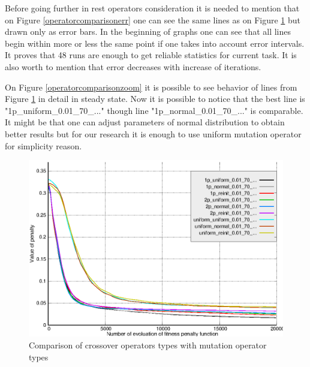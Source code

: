 \documentclass[12pt]{report}
\begin{document}
Before going further in rest operators consideration it is needed to mention that on Figure \ref{operatorcomparisonerr} one can see the same lines as on Figure \ref{operatorcomparison} but drawn only as error bars. In the beginning of graphs one can see that all lines begin within more or less the same point if one takes into account error intervals. It proves that 48 runs are enough to get reliable statistics for current task. It is also worth to mention that error decreases with increase of iterations.

On Figure \ref{operatorcomparisonzoom} it is possible to see behavior of lines from Figure \ref{operatorcomparison} in detail in steady state. Now it is possible to notice that the best line is "1p\_uniform\_0.01\_70\_..." though line "1p\_normal\_0.01\_70\_..." is comparable. It might be that one can adjust parameters of normal distribution to obtain better results but for our research it is enough to use uniform mutation operator for simplicity reason.

\begin{figure}
    \centering
    \includegraphics[width=5.0in]{operators_comparison}
    \caption{Comparison of crossover operators types with mutation operator types}
    \label{operatorcomparison}
\end{figure}
\end{document}
